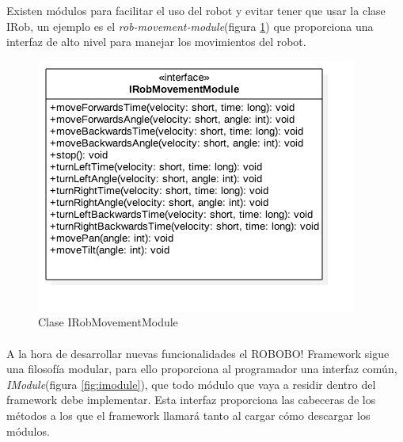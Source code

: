 Existen módulos para facilitar el uso del robot y evitar tener que usar la clase IRob, un ejemplo es el \textit{rob-movement-module}(figura \ref{fig:irob-movement}) que proporciona una interfaz de alto nivel para manejar los movimientos del robot.


\begin{figure}
	\centering
	\includegraphics[width=0.9\linewidth]{imagenes/diagramas/IRobMovementModule.png}
	\caption{Clase IRobMovementModule}
	\label{fig:irob-movement}
\end{figure}








\paragraph*{ }
A la hora de desarrollar nuevas funcionalidades el ROBOBO! Framework sigue una filosofía modular, para ello proporciona al programador una interfaz común, \textit{IModule}(figura \ref{fig:imodule}), que todo módulo que vaya a residir dentro del framework debe implementar. Esta interfaz proporciona las cabeceras de los métodos a los que el framework llamará tanto al cargar cómo descargar los módulos.

